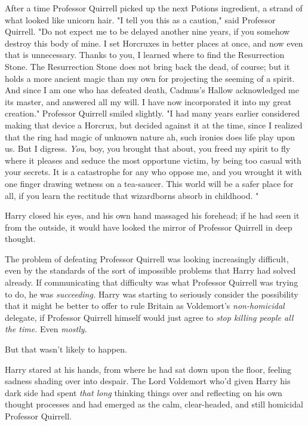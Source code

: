 After a time Professor Quirrell picked up the next Potions ingredient, a strand
of what looked like unicorn hair. "I tell you this as a caution," said
Professor Quirrell. "Do not expect me to be delayed another nine years, if you
somehow destroy this body of mine. I set Horcruxes in better places at once,
and now even that is unnecessary. Thanks to you, I learned where to find the
Resurrection Stone. The Resurrection Stone does not bring back the dead, of
course; but it holds a more ancient magic than my own for projecting the
seeming of a spirit. And since I am one who has defeated death, Cadmus's Hallow
acknowledged me its master, and answered all my will. I have now incorporated
it into my great creation." Professor Quirrell smiled slightly. "I had many
years earlier considered making that device a Horcrux, but decided against it
at the time, since I realized that the ring had magic of unknown nature{\el}
ah, such ironies does life play upon us. But I digress. \emph{You}, boy, you
brought that about, you freed my spirit to fly where it pleases and seduce the
most opportune victim, by being too casual with your secrets. It is a
catastrophe for any who oppose me, and you wrought it with one finger drawing
wetness on a tea-saucer. This world will be a safer place for all, if you learn
the rectitude that wizardborns absorb in childhood. "

Harry closed his eyes, and his own hand massaged his forehead; if he had seen
it from the outside, it would have looked the mirror of Professor Quirrell in
deep thought.

The problem of defeating Professor Quirrell was looking increasingly difficult,
even by the standards of the sort of impossible problems that Harry had solved
already. If communicating that difficulty was what Professor Quirrell was
trying to do, he was \emph{succeeding.} Harry was starting to seriously
consider the possibility that it might be better to offer to rule Britain as
Voldemort's \emph{non-homicidal} delegate, if Professor Quirrell himself would
just agree to \emph{stop killing people all the time.} Even \emph{mostly}.

But that wasn't likely to happen.

Harry stared at his hands, from where he had sat down upon the floor, feeling
sadness shading over into despair. The Lord Voldemort who'd given Harry his
dark side had spent \emph{that long} thinking things over and reflecting on his
own thought processes{\el} and had emerged as the calm, clear-headed, and
still homicidal Professor Quirrell.


